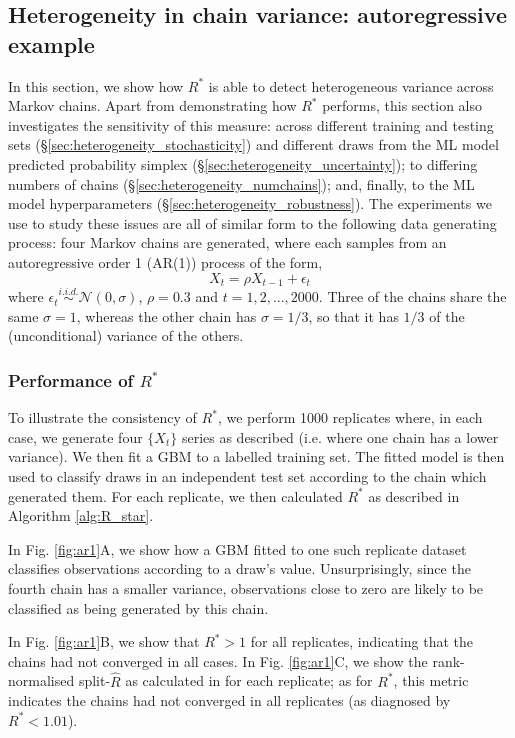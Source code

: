\documentclass{article}
\begin{document}
\subsection{Heterogeneity in chain variance: autoregressive example}\label{sec:heterogeneity}
In this section, we show how $R^*$ is able to detect heterogeneous variance across Markov chains. Apart from demonstrating how $R^*$ performs, this section also investigates the sensitivity of this measure: across different training and testing sets (\S\ref{sec:heterogeneity_stochasticity}) and different draws from the ML model predicted probability simplex (\S\ref{sec:heterogeneity_uncertainty}); to differing numbers of chains (\S\ref{sec:heterogeneity_numchains}); and, finally, to the ML model hyperparameters (\S\ref{sec:heterogeneity_robustness}). The experiments we use to study these issues are all of similar form to the following data generating process: four Markov chains are generated, where each samples from an autoregressive order 1 (AR(1)) process of the form,
%
\begin{equation}\label{eq:ar1}
X_t = \rho X_{t-1} + \epsilon_t
\end{equation}
%
where $\epsilon_t\stackrel{i.i.d.}{\sim}\mathcal{N}(0, \sigma)$, $\rho=0.3$ and $t=1,2,...,2000$. Three of the chains share the same $\sigma=1$, whereas the other chain has $\sigma=1/3$, so that it has $1/3$ of the (unconditional) variance of the others.

\subsubsection{Performance of $R^*$}\label{sec:heterogeneity_performance}
To illustrate the consistency of $R^*$, we perform 1000 replicates where, in each case, we generate four $\{X_t\}$ series as described (i.e. where one chain has a lower variance). We then fit a GBM to a labelled training set. The fitted model is then used to classify draws in an independent test set according to the chain which generated them. For each replicate, we then calculated $R^*$ as described in Algorithm \ref{alg:R_star}.

In Fig. \ref{fig:ar1}A, we show how a GBM fitted to one such replicate dataset classifies observations according to a draw's value. Unsurprisingly, since the fourth chain has a smaller variance, observations close to zero are likely to be classified as being generated by this chain.

In Fig. \ref{fig:ar1}B, we show that $R^*>1$ for all replicates, indicating that the chains had not converged in all cases. In Fig. \ref{fig:ar1}C, we show the rank-normalised split-$\widehat{R}$ as calculated in \cite{vehtari2019rank} for each replicate;  as for $R^*$, this metric indicates the chains had not converged in all replicates (as diagnosed by $R^*<1.01$).
\end{document}
